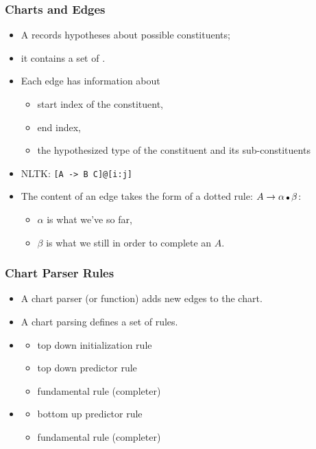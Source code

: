 \begin{frame}[fragile]
 \frametitle{Charts and Edges}


 \begin{itemize}
 \item A  records hypotheses about possible constituents;
 \item it contains a set of .
 \item Each edge has information about
   \begin{itemize}
   \item start index of the constituent,
   \item end index,
   \item the hypothesized type of the constituent and its sub-constituents
   \end{itemize}
 \item NLTK: \verb![A -> B C]@[i:j]!
 \item The content of an edge takes the form of a dotted rule:
$A \rightarrow \alpha \, \bigdot \, \beta$:
\begin{itemize}
\item $\alpha$ is what we've  so far,
\item $\beta$ is what we still   in order to complete an $A$.
\end{itemize}
 \end{itemize}


\end{frame}

\begin{frame}[fragile]
 \frametitle{Chart Parser Rules}


 \begin{itemize}
 \item A chart parser  (or function) adds new edges to the chart.
 \item A chart parsing  defines a set of rules.
 \item {}
   \begin{itemize}
   \item top down initialization rule
   \item top down predictor rule
   \item fundamental rule (completer)
   \end{itemize}
 \item {}
   \begin{itemize}
   \item bottom up predictor rule
   \item fundamental rule (completer)
   \end{itemize}
 
 \end{itemize}


\end{frame}

